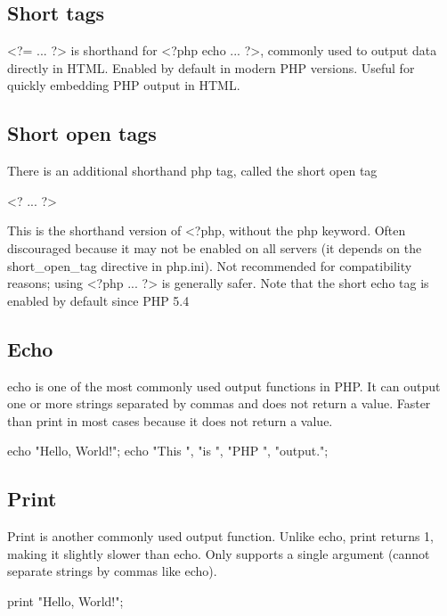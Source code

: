 \documentclass{report}
\begin{document}
    \subsection{Short tags}
    \bigbreak \noindent 
    <?= ... ?> is shorthand for <?php echo ... ?>, commonly used to output data directly in HTML.
    \bigbreak \noindent 
    Enabled by default in modern PHP versions.
    \bigbreak \noindent 
    Useful for quickly embedding PHP output in HTML.
    \bigbreak \noindent 

    \bigbreak \noindent 
    \subsection{Short open tags}
    \bigbreak \noindent 
    There is an additional shorthand php tag, called the short open tag
    \bigbreak \noindent 
    \begin{phpcode}
    <? ... ?>
    \end{phpcode}
    \bigbreak \noindent 
    This is the shorthand version of <?php, without the php keyword.
    \bigbreak \noindent 
    Often discouraged because it may not be enabled on all servers (it depends on the short\_open\_tag directive in php.ini).
    \bigbreak \noindent 
    Not recommended for compatibility reasons; using <?php ... ?> is generally safer.
    \bigbreak \noindent 
    Note that the short echo tag is enabled by default since PHP 5.4


    \pagebreak 
    \bigbreak \noindent 
    \subsection{Echo}
    \bigbreak \noindent 
    echo is one of the most commonly used output functions in PHP.
    \bigbreak \noindent 
    It can output one or more strings separated by commas and does not return a value.
    \bigbreak \noindent 
    Faster than print in most cases because it does not return a value.
    \bigbreak \noindent 
    \begin{phpcode}
        echo "Hello, World!";
        echo "This ", "is ", "PHP ", "output.";
    \end{phpcode}

    \bigbreak \noindent 
    \subsection{Print}
    \bigbreak \noindent 
    Print is another commonly used output function.
    \bigbreak \noindent 
    Unlike echo, print returns 1, making it slightly slower than echo.
    \bigbreak \noindent 
    Only supports a single argument (cannot separate strings by commas like echo).
    \bigbreak \noindent 
    \begin{phpcode}
    print "Hello, World!";
    \end{phpcode}
\end{document}
